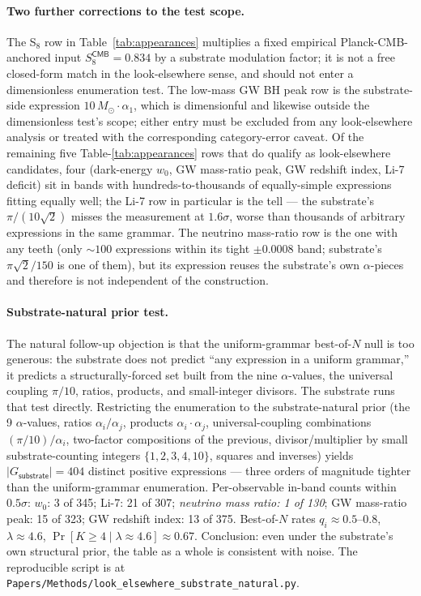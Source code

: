 \documentclass[11pt,a4paper]{amsart}
\theoremstyle{plain}
\theoremstyle{definition}
\begin{document}
\paragraph{Two further corrections to the test scope.} The S$_8$ row in Table~\ref{tab:appearances} multiplies a fixed empirical Planck-CMB-anchored input $S_8^{\textsf{CMB}} = 0.834$ by a substrate modulation factor; it is not a free closed-form match in the look-elsewhere sense, and should not enter a dimensionless enumeration test. The low-mass GW BH peak row is the substrate-side expression $10\,M_\odot \cdot \alpha_1$, which is dimensionful and likewise outside the dimensionless test's scope; either entry must be excluded from any look-elsewhere analysis or treated with the corresponding category-error caveat. Of the remaining five Table-\ref{tab:appearances} rows that do qualify as look-elsewhere candidates, four (dark-energy $w_0$, GW mass-ratio peak, GW redshift index, Li-7 deficit) sit in bands with hundreds-to-thousands of equally-simple expressions fitting equally well; the Li-7 row in particular is the tell --- the substrate's $\pi/(10\sqrt{2})$ misses the measurement at $1.6\sigma$, worse than thousands of arbitrary expressions in the same grammar. The neutrino mass-ratio row is the one with any teeth (only $\sim 100$ expressions within its tight $\pm 0.0008$ band; substrate's $\pi\sqrt{2}/150$ is one of them), but its expression reuses the substrate's own $\alpha$-pieces and therefore is not independent of the construction.

\paragraph{Substrate-natural prior test.} The natural follow-up objection is that the uniform-grammar best-of-$N$ null is too generous: the substrate does not predict ``any expression in a uniform grammar,'' it predicts a structurally-forced set built from the nine $\alpha$-values, the universal coupling $\pi/10$, ratios, products, and small-integer divisors. The substrate runs that test directly. Restricting the enumeration to the substrate-natural prior (the 9 $\alpha$-values, ratios $\alpha_i/\alpha_j$, products $\alpha_i \cdot \alpha_j$, universal-coupling combinations $(\pi/10)/\alpha_i$, two-factor compositions of the previous, divisor/multiplier by small substrate-counting integers $\{1, 2, 3, 4, 10\}$, squares and inverses) yields $|G_{\textsf{substrate}}| = 404$ distinct positive expressions --- three orders of magnitude tighter than the uniform-grammar enumeration. Per-observable in-band counts within $0.5\sigma$: $w_0$: 3 of 345; Li-7: 21 of 307; \emph{neutrino mass ratio: 1 of 130}; GW mass-ratio peak: 15 of 323; GW redshift index: 13 of 375. Best-of-$N$ rates $q_i \approx 0.5\text{--}0.8$, $\lambda \approx 4.6$, $\Pr[K \geq 4 \mid \lambda \approx 4.6] \approx 0.67$. Conclusion: even under the substrate's own structural prior, the table as a whole is consistent with noise. The reproducible script is at \texttt{Papers/Methods/look\_elsewhere\_substrate\_natural.py}.
\end{document}
